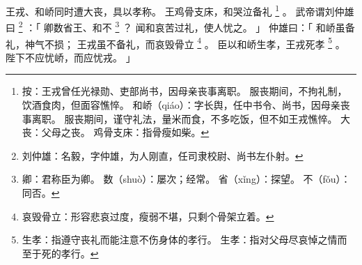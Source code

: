 
\switchcolumn*[\section{}]

王戎、和峤同时遭大丧，具以孝称。
王鸡骨支床，和哭泣备礼%
\footnote{%
    按：王戎曾任光禄勋、吏部尚书，因母亲丧事离职。
        服丧期间，不拘礼制，饮酒食肉，但面容憔悴。
    和峤（qiáo）：字长舆，任中书令、尚书，因母亲丧事离职。
                  服丧期间，谨守礼法，量米而食，不多吃饭，但不如王戎憔悴。
    大丧：父母之丧。
    鸡骨支床：指骨瘦如柴。
}%
。
武帝谓刘仲雄曰%
\footnote{%
    刘仲雄：名毅，字仲雄，为人刚直，任司隶校尉、尚书左仆射。
}%
：「
    卿数省王、和不%
    \footnote{%
        卿：君称臣为卿。
        数（shuò）：屡次；经常。
        省（xǐng）：探望。
        不（fǒu）：同否。
    }%
    ？
    闻和哀苦过礼，使人忧之。
」
仲雄曰：「
    和峤虽备礼，神气不损；
    王戎虽不备礼，而哀毁骨立%
    \footnote{%
        哀毁骨立：形容悲哀过度，瘦弱不堪，只剩个骨架立着。
    }%
    。
    臣以和峤生孝，王戎死孝%
    \footnote{%
        生孝：指遵守丧礼而能注意不伤身体的孝行。
        生孝：指对父母尽哀悼之情而至于死的孝行。
    }%
    。
    陛下不应忧峤，而应忧戎。
」

\switchcolumn


